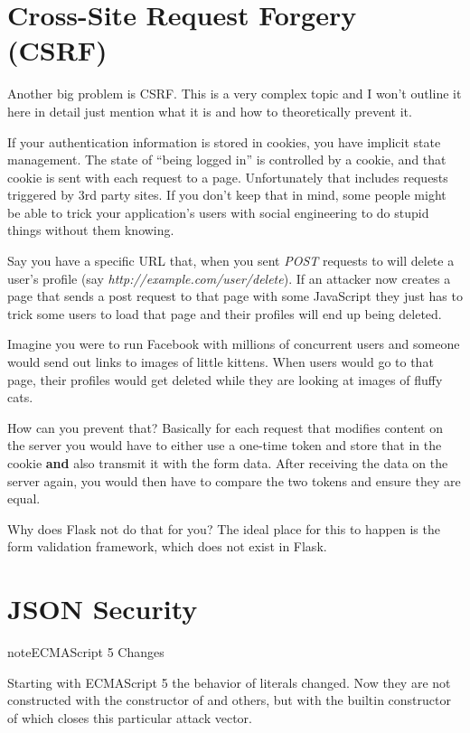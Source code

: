 \documentclass[a4paper,12pt]{sphinxmanual}
\begin{document}
\section{Cross-Site Request Forgery (CSRF)}
\label{security:cross-site-request-forgery-csrf}
Another big problem is CSRF.  This is a very complex topic and I won't
outline it here in detail just mention what it is and how to theoretically
prevent it.

If your authentication information is stored in cookies, you have implicit
state management.  The state of ``being logged in'' is controlled by a
cookie, and that cookie is sent with each request to a page.
Unfortunately that includes requests triggered by 3rd party sites.  If you
don't keep that in mind, some people might be able to trick your
application's users with social engineering to do stupid things without
them knowing.

Say you have a specific URL that, when you sent \emph{POST} requests to will
delete a user's profile (say \emph{http://example.com/user/delete}).  If an
attacker now creates a page that sends a post request to that page with
some JavaScript they just has to trick some users to load that page and
their profiles will end up being deleted.

Imagine you were to run Facebook with millions of concurrent users and
someone would send out links to images of little kittens.  When users
would go to that page, their profiles would get deleted while they are
looking at images of fluffy cats.

How can you prevent that?  Basically for each request that modifies
content on the server you would have to either use a one-time token and
store that in the cookie \textbf{and} also transmit it with the form data.
After receiving the data on the server again, you would then have to
compare the two tokens and ensure they are equal.

Why does Flask not do that for you?  The ideal place for this to happen is
the form validation framework, which does not exist in Flask.


\section{JSON Security}
\label{security:json-security}\label{security:id1}
\begin{notice}{note}{ECMAScript 5 Changes}

Starting with ECMAScript 5 the behavior of literals changed.  Now they
are not constructed with the constructor of  and others, but
with the builtin constructor of  which closes this particular
attack vector.
\end{notice}
\end{document}
